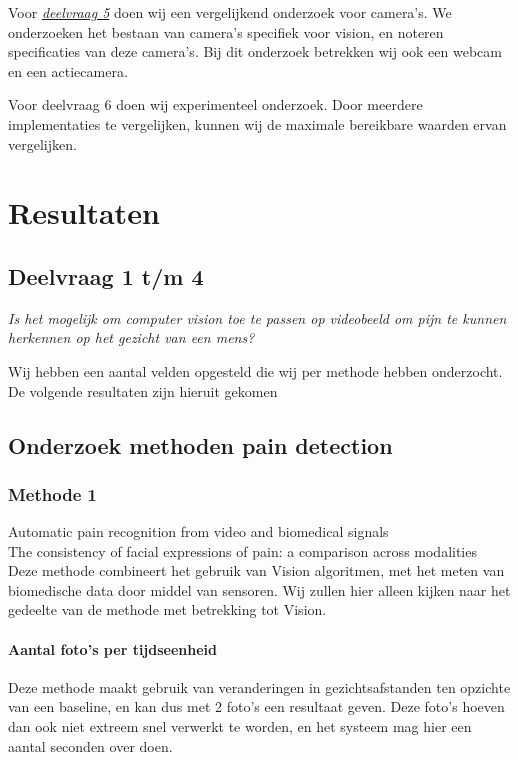 \documentclass[11pt]{article}
\begin{document}
    Voor \emph{\hyperref[itm:dv1]{deelvraag 5}} doen wij een vergelijkend onderzoek voor camera's.
    We onderzoeken het bestaan van camera's specifiek voor vision, en noteren specificaties van deze camera's.
    Bij dit onderzoek betrekken wij ook een webcam en een actiecamera.

    Voor deelvraag 6 doen wij experimenteel onderzoek.
    Door meerdere implementaties te vergelijken, kunnen wij de maximale bereikbare waarden ervan vergelijken.


    \section{Resultaten}\label{sec:resultaten}

    \subsection{Deelvraag 1 t/m 4}\label{subsec:deelvraag-1-t/m-4}
    \emph{Is het mogelijk om computer vision toe te passen op videobeeld om pijn te kunnen herkennen op het gezicht van een mens?}

    Wij hebben een aantal velden opgesteld die wij per methode hebben onderzocht.
    De volgende resultaten zijn hieruit gekomen

    \subsection{Onderzoek methoden pain detection}\label{subsec:onderzoek-methoden-pain-detection}

    \subsubsection{Methode 1}

    \emph{\citet{werner2014automatic}} Automatic pain recognition from video and biomedical signals\\
    \emph{\citet{prkachin1992consistency}} The consistency of facial expressions of pain: a comparison across modalities\\
    Deze methode combineert het gebruik van Vision algoritmen, met het meten van biomedische data door middel van sensoren.
    Wij zullen hier alleen kijken naar het gedeelte van de methode met betrekking tot Vision.

    \paragraph{Aantal foto's per tijdseenheid}
    Deze methode maakt gebruik van veranderingen in gezichtsafstanden ten opzichte van een baseline, en kan dus met 2 foto's een resultaat geven.
    Deze foto's hoeven dan ook niet extreem snel verwerkt te worden, en het systeem mag hier een aantal seconden over doen.
\end{document}
